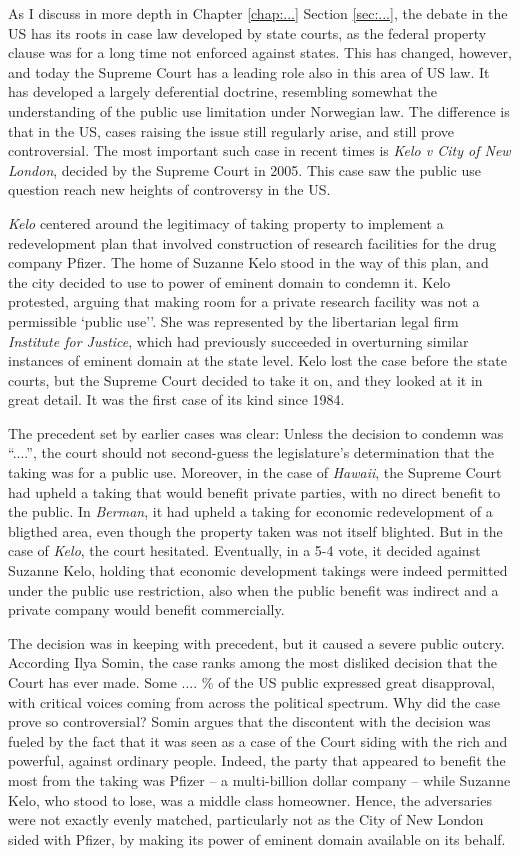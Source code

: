 As I discuss in more depth in Chapter \ref{chap:...} Section \ref{sec:...}, the debate in the US has its roots in case law developed by state courts, as the federal property clause was for a long time not enforced against states. This has changed, however, and today the Supreme Court has a leading role also in this area of US law. It has developed a largely deferential doctrine, resembling somewhat the understanding of the public use limitation under Norwegian law. The difference is that in the US, cases raising the issue  still regularly arise, and still prove controversial. The most important such case in recent times is {\it Kelo v City of New London}, decided by the Supreme Court in 2005. This case saw the public use question reach new heights of controversy in the US.

{\it Kelo} centered around the legitimacy of taking property to implement a redevelopment plan that involved construction of research facilities for the drug company Pfizer. The home of Suzanne Kelo stood in the way of this plan, and the city decided to use to power of eminent domain to condemn it. Kelo protested, arguing that making room for a private research facility was not a permissible  `public use''. She was represented by the libertarian legal firm {\it Institute for Justice}, which had previously succeeded in overturning similar instances of eminent domain at the state level. Kelo lost the case before the state courts, but the Supreme Court decided to take it on, and they looked at it in great detail. It was the first case of its kind since 1984. 

The precedent set by earlier cases was clear: Unless the decision to condemn was ``....'', the court should not second-guess the legislature's determination that the taking was for a public use. Moreover, in the case of {\it Hawaii}, the Supreme Court had upheld a taking that would benefit private parties, with no direct benefit to the public. In {\it Berman}, it had upheld a taking for economic redevelopment of a bligthed area, even though the property taken was not itself blighted. But in the case of {\it Kelo}, the court hesitated.  Eventually, in a 5-4 vote, it decided against Suzanne Kelo, holding that economic development takings were indeed permitted under the public use restriction, also when the public benefit was indirect and a private company would benefit commercially. 

The decision was in keeping with precedent, but it caused a severe public outcry. According Ilya Somin, the case ranks among the most disliked decision that the Court has ever made. Some .... \% of the US public expressed great disapproval, with critical voices coming from across the political spectrum. Why did the case prove so controversial? Somin argues that the discontent with the decision  was fueled by the fact that it was seen as a case of the Court siding with the rich and powerful, against ordinary people. Indeed, the party that appeared to benefit the most from the taking was Pfizer -- a multi-billion dollar company -- while Suzanne Kelo, who stood to lose, was a middle class homeowner. Hence, the adversaries were not exactly evenly matched, particularly not as the City of New London sided with Pfizer, by making its power of eminent domain available on its behalf. 

